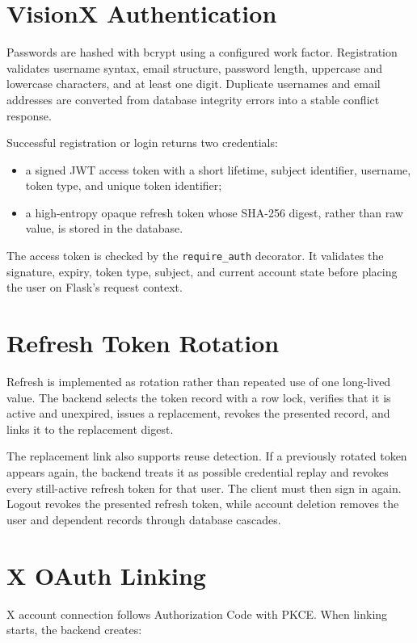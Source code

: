 \documentclass[11pt,a4paper]{report}
\newcommand{\code}[1]{\texttt{#1}}
\begin{document}
\section{VisionX Authentication}
Passwords are hashed with bcrypt using a configured work factor. Registration
validates username syntax, email structure, password length, uppercase and
lowercase characters, and at least one digit. Duplicate usernames and email
addresses are converted from database integrity errors into a stable conflict
response.

Successful registration or login returns two credentials:

\begin{itemize}
  \item a signed JWT access token with a short lifetime, subject identifier,
  username, token type, and unique token identifier;
  \item a high-entropy opaque refresh token whose SHA-256 digest, rather than
  raw value, is stored in the database.
\end{itemize}

The access token is checked by the \code{require\_auth} decorator. It validates
the signature, expiry, token type, subject, and current account state before
placing the user on Flask's request context.

\section{Refresh Token Rotation}
Refresh is implemented as rotation rather than repeated use of one long-lived
value. The backend selects the token record with a row lock, verifies that it
is active and unexpired, issues a replacement, revokes the presented record,
and links it to the replacement digest.

The replacement link also supports reuse detection. If a previously rotated
token appears again, the backend treats it as possible credential replay and
revokes every still-active refresh token for that user. The client must then
sign in again. Logout revokes the presented refresh token, while account
deletion removes the user and dependent records through database cascades.

\section{X OAuth Linking}
X account connection follows Authorization Code with PKCE. When linking starts,
the backend creates:
\end{document}
